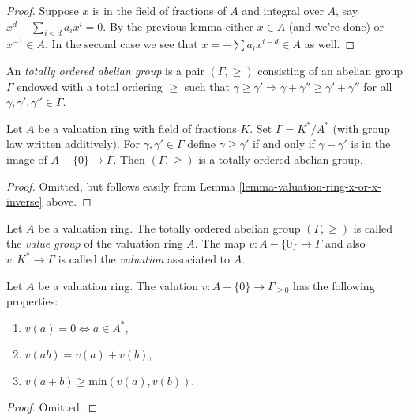 \begin{proof}
Suppose $x$ is in the field of fractions of $A$ and integral over $A$,
say $x^d + \sum_{i < d} a_i x^i = 0$. By the previous lemma either
$x \in A$ (and we're done) or $x^{-1} \in A$. In the second case
we see that $x = - \sum a_i x^{i - d} \in A$ as well.
\end{proof}

\noindent
An {\it totally ordered abelian group} is a pair $(\Gamma, \geq)$
consisting of an abelian group $\Gamma$ endowed with a total
ordering $\geq$ such that $\gamma \geq \gamma' \Rightarrow
\gamma + \gamma'' \geq \gamma' + \gamma''$ for all
$\gamma, \gamma', \gamma'' \in \Gamma$. 

\begin{lemma}
\label{lemma-valuation-group}
Let $A$ be a valuation ring with field of fractions $K$.
Set $\Gamma = K^*/A^*$ (with group law written additively).
For $\gamma, \gamma' \in \Gamma$
define $\gamma \geq \gamma'$ if and only if
$\gamma - \gamma'$ is in the image of $A - \{0\} \to \Gamma$.
Then $(\Gamma, \geq)$ is a totally ordered abelian group.
\end{lemma}

\begin{proof}
Omitted, but follows easily from
Lemma \ref{lemma-valuation-ring-x-or-x-inverse} above.
\end{proof}

\begin{definition}
\label{definition-value-group}
Let $A$ be a valuation ring. The totally ordered abelian group
$(\Gamma, \geq)$ is called the {\it value group} of the valuation
ring $A$. The map $v : A - \{0\} \to \Gamma$ and also
$v : K^* \to \Gamma$ is called the {\it valuation} associated to $A$.
\end{definition}

\begin{lemma}
\label{lemma-properties-valuation}
Let $A$ be a valuation ring. The valution $v : A -\{0\} \to \Gamma_{\geq 0}$
has the following properties:
\begin{enumerate}
\item $v(a) = 0 \Leftrightarrow a \in A^*$,
\item $v(ab) = v(a) + v(b)$,
\item $v(a + b) \geq \text{min}(v(a), v(b))$.
\end{enumerate}
\end{lemma}

\begin{proof}
Omitted.
\end{proof}

